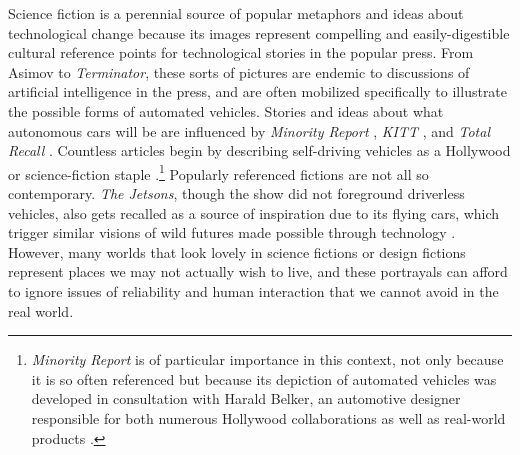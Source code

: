 

Science fiction is a perennial source of popular metaphors and ideas
about technological change because its
images represent compelling and easily-digestible
cultural reference 
points for technological stories in the popular press. From Asimov to
\emph{Terminator}, 
these sorts of pictures are endemic to discussions of artificial
intelligence in the press, and are often mobilized specifically to
illustrate the possible forms of automated vehicles. Stories and ideas
about what autonomous cars will be are
influenced by \emph{Minority Report} \cite{fromHollywood}, \emph{KITT}
\cite{wadeKITT}, and \emph{Total
  Recall} \cite{pasdirtzSolution}. Countless articles begin by describing
self-driving vehicles as a Hollywood or science-fiction
staple \cite{scifiToReality}.\footnote{\emph{Minority Report} is of particular
importance in this context, not only because it is so often referenced
but because its depiction of automated vehicles was developed in
consultation with Harald Belker, an automotive designer responsible
for both numerous Hollywood collaborations as well as real-world
products \cite{melansonMinority}.} Popularly referenced fictions are
not all so contemporary. \emph{The Jetsons}, though
the show did not foreground driverless vehicles, also gets
recalled as a source of inspiration due to its flying cars,
which trigger similar visions of wild 
futures made possible through technology \cite{JetsonsAge}. However, many
worlds that look lovely in science fictions or design fictions represent places 
we may not actually wish to live, and these portrayals can afford to
ignore issues of reliability and human interaction that we cannot avoid
in the real world. 



